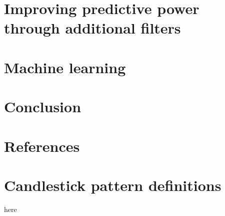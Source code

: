 \documentclass[
  12pt,
  a4paper,
  oneside]{book}
\begin{document}
\chapter{Improving predictive power through additional filters}\label{improving-predictive-power-through-additional-filters}

\chapter{Machine learning}\label{machine-learning}

\chapter{Conclusion}\label{conclusion}

\chapter{References}\label{references}

\appendix


\chapter{Candlestick pattern definitions}\label{candlestick-pattern-definitions}

here

  
\end{document}
